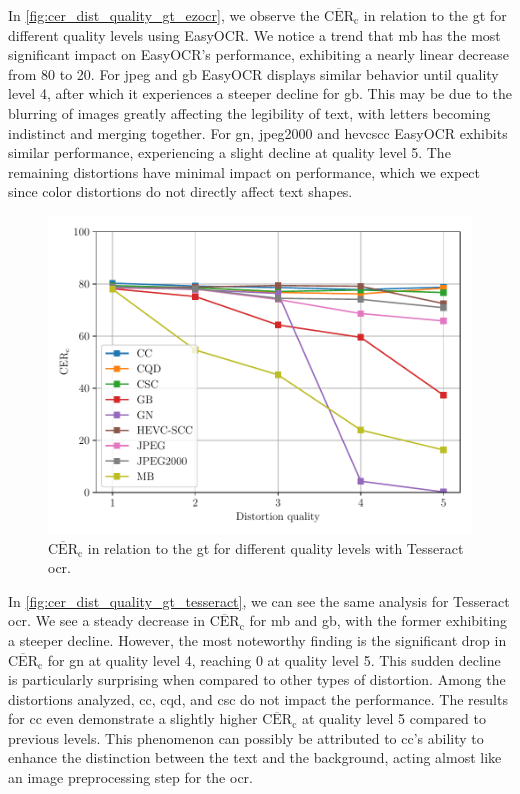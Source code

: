 In \autoref{fig:cer_dist_quality_gt_ezocr}, we observe the $\overline{\text{CER}}_{\text{c}}$ in relation to the \gls{gt} for different quality levels using EasyOCR.
We notice a trend that \gls{mb} has the most significant impact on EasyOCR's performance, exhibiting a nearly linear decrease from 80 to 20.
For \gls{jpeg} and \gls{gb} EasyOCR displays similar behavior until quality level 4, after which it experiences a steeper decline for \gls{gb}.
This may be due to the blurring of images greatly affecting the legibility of text, with letters becoming indistinct and merging together.
For \gls{gn}, \gls{jpeg2000} and \gls{hevcscc} EasyOCR exhibits similar performance, experiencing a slight decline at quality level 5.
The remaining distortions have minimal impact on performance, which we expect since color distortions do not directly affect text shapes.

\begin{figure}[h!]
\centering
    \includegraphics[width=\textwidth]{../../images/analyze/cer_dist_quality_gt_tess.pdf}
    \caption{$\overline{\text{CER}}_{\text{c}}$ in relation to the \gls{gt} for different quality levels with Tesseract \gls{ocr}.}
\label{fig:cer_dist_quality_gt_tesseract}
\end{figure}

In \autoref{fig:cer_dist_quality_gt_tesseract}, we can see the same analysis for Tesseract \gls{ocr}.
We see a steady decrease in $\overline{\text{CER}}_{\text{c}}$ for \gls{mb} and \gls{gb}, with the former exhibiting a steeper decline.
However, the most noteworthy finding is the significant drop in $\overline{\text{CER}}_{\text{c}}$ for \gls{gn} at quality level 4, reaching 0 at quality level 5.
This sudden decline is particularly surprising when compared to other types of distortion.
Among the distortions analyzed, \gls{cc}, \gls{cqd}, and \gls{csc} do not impact the performance.
The results for \gls{cc} even demonstrate a slightly higher $\overline{\text{CER}}_{\text{c}}$ at quality level 5 compared to previous levels.
This phenomenon can possibly be attributed to \gls{cc}'s ability to enhance the distinction between the text and the background, acting almost like an image preprocessing step for the \gls{ocr}.

